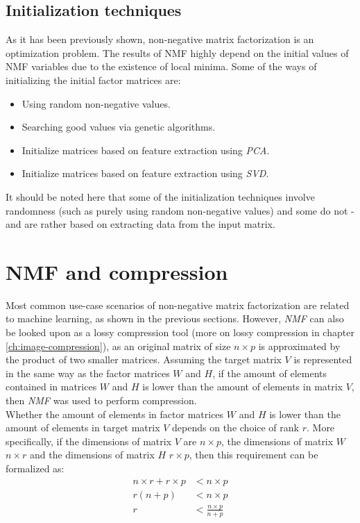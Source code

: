 \documentclass[thesis=M,english]{FITthesis}[2012/10/20]
\begin{document}
\subsection{Initialization techniques}
As it has been previously shown, non-negative matrix factorization is an optimization
problem. The results of NMF highly depend on the initial values of NMF variables due to
the existence of local minima. Some of the ways of initializing the initial factor
matrices are:
\begin{itemize}
  \item Using random non-negative values.
  \item Searching good values via genetic algorithms.
  \item Initialize matrices based on feature extraction using \emph{PCA}.
  \item Initialize matrices based on feature extraction using \emph{SVD}.
\end{itemize}\cite{nmfinit}

It should be noted here that some of the initialization techniques involve randomness
(such as purely using random non-negative values) and some do not - and are rather
based on extracting data from the input matrix.


\section{NMF and compression}
Most common use-case scenarios of non-negative matrix factorization are
related to machine learning, as shown in the previous sections. However,
\emph{NMF} can also be looked upon as a lossy compression tool (more
on lossy compression in chapter \ref{ch:image-compression}), as an
original matrix of size $n \times p$ is approximated by the product
of two smaller matrices. Assuming the target matrix $V$ is represented
in the same way as the factor matrices $W$ and $H$, if the amount
of elements contained in matrices $W$ and $H$ is lower than the amount of
elements in matrix $V$, then \emph{NMF} was used to perform compression.
\\

Whether the amount of elements in factor matrices $W$ and $H$ is lower than
the amount of elements in target matrix $V$ depends on the choice of rank $r$.
More specifically, if the dimensions of matrix $V$ are $n \times p$, the
dimensions of matrix $W$ $n \times r$ and the dimensions of matrix $H$
$r \times p$, then this requirement can be formalized as:
\begin{align*}
  n \times r + r \times p &< n \times p\\
  r (n + p) &< n \times p\\
  r &< \frac{n \times p}{n + p}
\end{align*}
\end{document}
